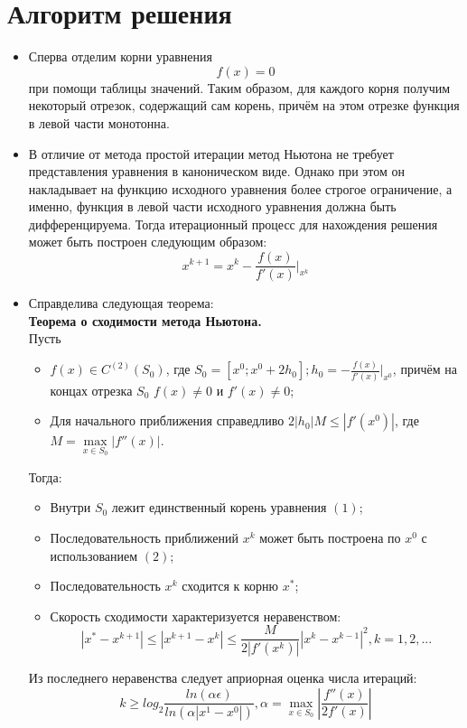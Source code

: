 \documentclass[14pt, a4paper]{article}
\begin{document}
  \section{Алгоритм решения}
  \begin{itemize}
    \item
    Сперва отделим корни уравнения \begin{equation}f(x) = 0\end{equation} при помощи таблицы значений. Таким образом, для каждого корня получим некоторый отрезок, содержащий сам корень, причём на этом отрезке функция в левой части монотонна.
    \item
    В отличие от метода простой итерации метод Ньютона не требует представления уравнения в каноническом виде. Однако при этом он накладывает на функцию исходного уравнения более строгое ограничение, а именно,
    функция в левой части исходного уравнения должна быть дифференцируема. Тогда итерационный процесс для нахождения решения может быть построен следующим образом:
    \begin{equation}x^{k + 1} = x^k - \frac{f(x)}{f'(x)}\bigg|_{x^k}\end{equation}
    \item
    Справделива следующая теорема: \\
    \textbf{Теорема о сходимости метода Ньютона.} \\
    Пусть 
    \begin{itemize}
    \item
    $f(x) \in C^{(2)}(S_0)$, где $S_0 = [x^0; x^0 + 2h_0]; h_0 = -\frac{f(x)}{f'(x)}\bigg|_{x^0}$, причём на концах отрезка $S_0$ $f(x) \neq 0$ и $f'(x) \neq 0$;
    \item
    Для начального приближения справедливо $2|h_0|M \leq |f'(x^0)|$, где $M = \max\limits_{x \in S_0} |f''(x)|$.
    \end{itemize}
    Тогда:
    \begin{itemize}
    \item
    Внутри $S_0$ лежит единственный корень уравнения $(1)$;
    \item
    Последовательность приближений $x^k$ может быть построена по $x^0$ с использованием $(2)$;
    \item
    Последовательность $x^k$ сходится к корню $x^*$;
    \item
    Скорость сходимости характеризуется неравенством:
    \begin{equation}|x^* - x^{k + 1}| \leq |x^{k + 1} - x^k| \leq \frac{M}{2|f'(x^k)|}|x^k - x^{k - 1}|^2, k = 1, 2, ... \end{equation}
    \end{itemize}
    Из последнего неравенства следует априорная оценка числа итераций:
    \begin{equation} k \geq log_2\frac{ln(\alpha\epsilon)}{ln(\alpha|x^1 - x^0|)}, \alpha = \max\limits_{x \in S_0} \left|\frac{f''(x)}{2f'(x)}\right| \end{equation}
  \end{itemize}
\end{document}

